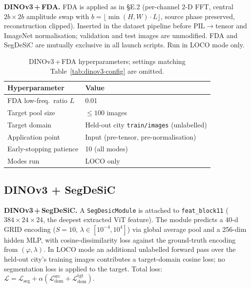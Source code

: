 \textbf{DINOv3\,+\,FDA.}
FDA is applied as in \S E.2 (per-channel 2-D FFT, central
$2b{\times}2b$ amplitude swap with $b{=}\lfloor\min(H,W)\cdot
L\rfloor$, source phase preserved, reconstruction clipped).
Inserted in the dataset pipeline before PIL$\to$tensor and ImageNet
normalisation; validation and test images are unmodified.  FDA and
SegDeSiC are mutually exclusive in all launch scripts.  Run in LOCO
mode only.

\begin{table}[h]
\centering
\caption{DINOv3\,+\,FDA hyperparameters; settings matching
Table~\ref{tab:dinov3-config} are omitted.}
\label{tab:dinov3-fda}
\small
\begin{tabular}{@{}ll@{}}
\toprule
\textbf{Hyperparameter} & \textbf{Value} \\
\midrule
FDA low-freq.\ ratio $L$ & 0.01 \\
Target pool size         & $\leq 100$ images \\
Target domain            & Held-out city \texttt{train/images} (unlabelled) \\
Application point        & Input (pre-tensor, pre-normalisation) \\
Early-stopping patience  & 10 (all modes) \\
Modes run                & LOCO only \\
\bottomrule
\end{tabular}
\end{table}

\subsection{DINOv3 + SegDeSiC}

\textbf{DINOv3\,+\,SegDeSiC.}
A \texttt{SegDesicModule} is attached to \texttt{feat\_block11}
($384{\times}24{\times}24$, the deepest extracted ViT feature).  The
module predicts a 40-d GRID encoding ($S{=}10$,
$\lambda{\in}[10^{-4},10^{4}]$) via global average pool and a 256-dim
hidden MLP, with cosine-dissimilarity loss against the ground-truth
encoding from $(\varphi,\lambda)$.  In LOCO mode an additional
unlabelled forward pass over the held-out city's training images
contributes a target-domain cosine loss; no segmentation loss is
applied to the target.  Total loss:
$\mathcal{L} = \mathcal{L}_\text{seg} + \alpha(\mathcal{L}^{\text{src}}_\text{dom}
+ \mathcal{L}^{\text{tgt}}_\text{dom})$.

